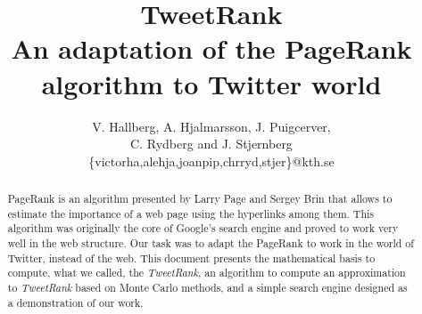 \documentclass[11pt,a4paper]{article}
\author{V. Hallberg, A. Hjalmarsson, J. Puigcerver, \\C. Rydberg and J. Stjernberg\\
\footnotesize{\{victorha,alehja,joanpip,chrryd,stjer\}@kth.se}}
\title{\Huge TweetRank \\ \LARGE An adaptation of the PageRank algorithm to Twitter world}
\begin{document}
\maketitle
 \vspace{30px}
\begin{abstract}
\noindent
PageRank is an algorithm presented by Larry Page and Sergey Brin that allows to estimate the importance of a web page using the hyperlinks among them. This algorithm was originally the core of Google's search engine and proved to work very well in the web structure. Our task was to adapt the PageRank to work in the world of Twitter, instead of the web. This document presents the mathematical basis to compute, what we called, the \emph{TweetRank}, an algorithm to compute an approximation to \emph{TweetRank} based on Monte Carlo methods, and a simple search engine designed as a demonstration of our work.
\end{abstract}

\newpage

\tableofcontents  

\newpage








\newpage



\end{document}
